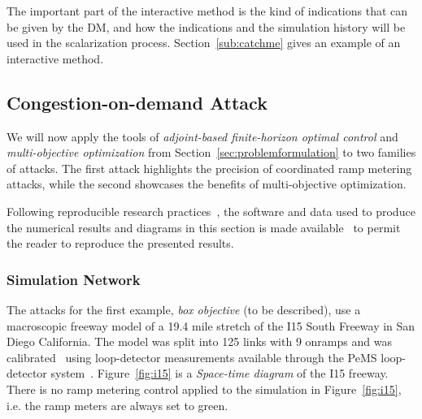 				The important part of the interactive method is the kind of indications that can be given by the DM, and how the indications and the simulation history will be used in the scalarization process. Section~\ref{sub:catchme} gives an example of an interactive method.

\subsection{Congestion-on-demand Attack}
\label{sub:congestion-on-demand}

We will now apply the tools of \emph{adjoint-based finite-horizon optimal control} and \emph{multi-objective optimization} from Section~\ref{sec:problemformulation} to two families of attacks. The first attack highlights the precision of coordinated ramp metering attacks, while the second showcases the benefits of multi-objective optimization.

Following reproducible research practices~\cite{donoho2009reproducible,stodden2009enabling}, the software and data used to produce the numerical results and diagrams in this section is made available~\cite{smartroadswebsite} to permit the reader to reproduce the presented results.

\subsubsection{Simulation Network}

The attacks for the first example, \emph{box objective} (to be described), use a macroscopic freeway model of a 19.4 mile stretch of the I15 South Freeway in San Diego California. The model was split into 125 links with 9 onramps and was calibrated~\cite{dervisoglu2014macroscopic,Muralidharan2009c} using loop-detector measurements available through the PeMS loop-detector system~\cite{jia2001pems}. Figure~\ref{fig:i15} is a \emph{Space-time diagram} of the I15 freeway. There is no ramp metering control applied to the simulation in Figure~\ref{fig:i15}, i.e. the ramp meters are always set to green.

